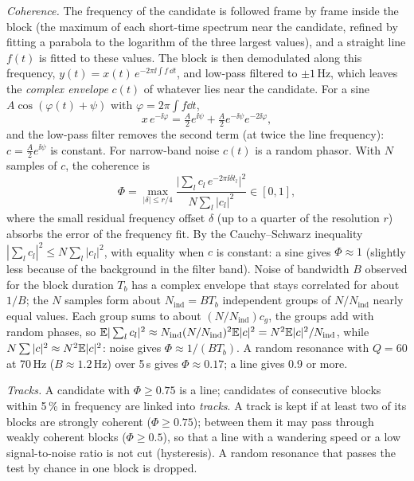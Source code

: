 \emph{Coherence.} The frequency of the candidate is followed frame by frame inside the block (the
maximum of each short-time spectrum near the candidate, refined by fitting a parabola to the logarithm
of the three largest values), and a straight line $f(t)$ is fitted to these values. The block is then
demodulated along this frequency, $y(t) = x(t)\,e^{-2\pi\ii\int f\,\dd t}$, and low-pass filtered to
$\pm1$\,Hz, which leaves the \emph{complex envelope} $c(t)$ of whatever lies near the candidate. For a
sine $A\cos(\varphi(t)+\psi)$ with $\varphi = 2\pi\int f\dd t$,
\begin{equation}
  x\,e^{-\ii\varphi} = \tfrac{A}{2}e^{\ii\psi} + \tfrac{A}{2}e^{-\ii\psi}e^{-2\ii\varphi},
\end{equation}
and the low-pass filter removes the second term (at twice the line frequency): $c = \tfrac
A2e^{\ii\psi}$ is constant. For narrow-band noise $c(t)$ is a random phasor. With $N$ samples of $c$,
the coherence is
\begin{equation}
  \Phi = \max_{|\delta|\le r/4}\frac{\bigl|\sum_l c_l\,e^{-2\pi\ii\delta t_l}\bigr|^2}{N\sum_l|c_l|^2}\in[0,1],
\end{equation}
where the small residual frequency offset $\delta$ (up to a quarter of the resolution $r$) absorbs
the error of the frequency fit. By the Cauchy--Schwarz inequality $|\sum_lc_l|^2\le N\sum_l|c_l|^2$, with
equality when $c$ is constant: a sine gives $\Phi\approx1$ (slightly less because of the background in
the filter band). Noise of bandwidth $B$ observed for the block duration $T_b$ has a complex envelope
that stays correlated for about $1/B$; the $N$ samples form about $N_{\mathrm{ind}} = BT_b$
independent groups of $N/N_{\mathrm{ind}}$ nearly equal values. Each group sums to about
$(N/N_{\mathrm{ind}})c_g$, the groups add with random phases, so $\mathbb{E}|\sum_lc_l|^2\approx
N_{\mathrm{ind}}(N/N_{\mathrm{ind}})^2\mathbb{E}|c|^2 = N^2\mathbb{E}|c|^2/N_{\mathrm{ind}}$, while $N\sum|c|^2\approx
N^2\mathbb{E}|c|^2$: noise gives $\Phi\approx1/(BT_b)$. A random resonance with $Q = 60$ at 70\,Hz ($B\approx
1.2$\,Hz) over 5\,s gives $\Phi\approx0.17$; a line gives 0.9 or more.

\emph{Tracks.} A candidate with $\Phi\ge0.75$ is a line; candidates of consecutive blocks within 5\,\%
in frequency are linked into \emph{tracks}. A track is kept if at least two of its blocks are strongly
coherent ($\Phi\ge0.75$); between them it may pass through weakly coherent blocks ($\Phi\ge0.5$), so
that a line with a wandering speed or a low signal-to-noise ratio is not cut (hysteresis). A random
resonance that passes the test by chance in one block is dropped.


